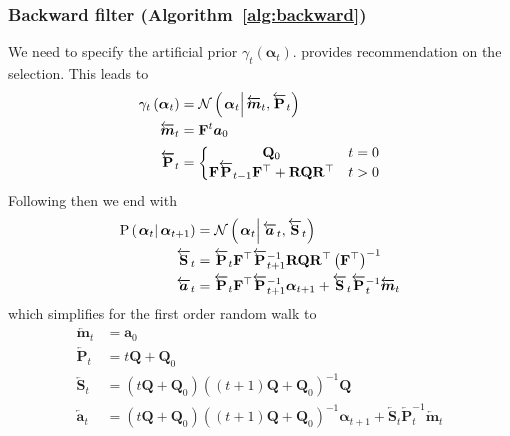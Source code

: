 \documentclass[notitlepage]{article}
\renewcommand{\vec}[1]{\bm{#1}}
\newcommand{\vecLarrow}[1]{\overleftarrow{\vec{#1}}}
\newcommand{\mat}[1]{\mathbf{#1}}
\newcommand{\matLarrow}[1]{\overleftarrow{\mat{#1}}}
\newcommand{\Lparen}[1]{\left( #1\right)}
\newcommand{\Cond}[2]{\left. #1 \vphantom{#2} \right\vert  #2}
\newcommand{\Prob}{\text{P}}
\newcommand{\optor}[2]{#1\Lparen{#2}}
\newcommand{\optorC}[3]{\optor{#1}{\Cond{#2}{#3}}}
\newcommand{\propC}[2]{\optorC{\Prob}{#1}{#2}}
\newcommand{\normalC}[3]{\optorC{\mathcal{N}}{#1}{#2,#3}}
\begin{document}
\subsubsection*{Backward filter (Algorithm~\ref{alg:backward})}
We need to specify the artificial prior $\gamma_t\Lparen{\vec{\alpha}_t}$. \citet[page 69 and 70]{briers09} provides recommendation on the selection. This leads to%
%
\begin{equation}\begin{split}
	\gamma_t\Lparen{\vec{\alpha}_t} &=
		\normalC{\vec{\alpha}_t}{\vecLarrow{m}_t}{\matLarrow{P}_t} \\
%
	\vecLarrow{m}_t &= \mat{F}^t\vec{a}_0 \\
%
	\matLarrow{P}_t &= \left\{
		\begin{matrix} \mat{Q}_0 & t = 0 \\ \mat{F}\matLarrow{P}_{t - 1}\mat{F}^\top + 
		\mat{R}\mat{Q}\mat{R}^{\top} & t > 0   \end{matrix} \right.
\end{split}\end{equation}
%
Following \cite{fearnhead10} then we end with%
%
\begin{equation}\label{eqn:bwTransProp}\begin{split}
	\propC{\vec{\alpha}_t}{\vec{\alpha}_{t+1}} &=
	\normalC{\vec{\alpha}_t}{\vecLarrow{a}_t}{\matLarrow{S}_t} \\
%
	\matLarrow{S}_t &= \matLarrow{P}_t\mat{F}^\top\matLarrow{P}_{t + 1}^{-1}\mat{R}\mat{Q}\mat{R}^\top\Lparen{\mat{F}^\top}^{-1} \\
%
	\vecLarrow{a}_t &=
		\matLarrow{P}_t\mat{F}^\top\matLarrow{P}_{t + 1}^{-1}\vec{\alpha}_{t+1}
		+ \matLarrow{S}_t\matLarrow{P}_t^{-1} \vecLarrow{m}_t
\end{split}\end{equation}%
%
which simplifies for the first order random walk to%
%
\begin{equation}\begin{split}
	\vecLarrow{m}_t &= \vec{a}_0 \\
%
	\matLarrow{P}_t &= t\mat{Q} + \mat{Q}_0 \\
%
	\matLarrow{S}_t &=
		\Lparen{t\mat{Q} + \mat{Q}_0}
		\Lparen{(t+1)\mat{Q} + \mat{Q}_0}^{-1}\mat{Q} \\
%
	\vecLarrow{a}_t &=
		\Lparen{t\mat{Q} + \mat{Q}_0}
		\Lparen{(t+1)\mat{Q} + \mat{Q}_0}^{-1}\vec{\alpha}_{t+1}
		+ \matLarrow{S}_t\matLarrow{P}_t^{-1} \vecLarrow{m}_t
\end{split}\end{equation}%
\end{document}
